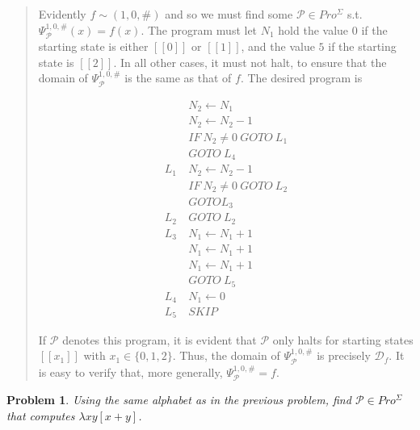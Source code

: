 \documentclass[a4paper, 12pt]{article}
\newtheorem{problem}{Problem}
\newtheorem{problem}{Problem}
\begin{document}
\small
\begin{quote}


Evidently $f \sim (1, 0, \#)$ and so we must find some $\mathcal{P} \in
Pro^{\Sigma}$ s.t. $\Psi_{\mathcal{P}}^{1, 0, \#}(x) = f(x)$. The program must
let $N_1$ hold the value $0$ if the starting state is either $[\![ 0 ]\!]$ or
$[\![ 1 ]\!]$, and the value $5$ if the starting state is $[\![ 2 ]\!]$. In all
other cases, it must not halt, to ensure that the domain of
$\Psi_{\mathcal{P}}^{1, 0, \#}$ is the same as that of $f$. The desired program
is 

\begin{align*}
    &N_2 \leftarrow N_1\\
    &N_2 \leftarrow N_2 - 1\\
    &IF ~ N_2 \neq 0 ~ GOTO ~L_1 \\ 
    &GOTO ~ L_4 \\ 
    L_1 ~ &N_2 \leftarrow N_2 - 1 \\ 
    &IF ~  N_2 \neq 0 ~ GOTO ~ L_2\\
    &GOTO L_3\\
    L_2~& GOTO ~ L_2 \\ 
    L_3 ~ & N_1 \leftarrow N_1 + 1\\
    & N_1 \leftarrow N_1 + 1\\
    & N_1 \leftarrow N_1 + 1 \\ 
    & GOTO ~ L_5 \\
    L_4 ~ & N_1 \leftarrow 0 \\ 
    L_5~& SKIP
\end{align*}

If $\mathcal{P}$ denotes this program, it is evident that $\mathcal{P}$ only
halts for starting states $[\![ x_1 ]\!]$ with $x_1 \in \{0, 1, 2\}$.
Thus, the domain of $\Psi_{\mathcal{P}}^{1, 0, \#}$ is precisely
$\mathcal{D}_f$. It is easy to verify that, more generally,
$\Psi_{\mathcal{P}}^{1, 0, \#} = f$.

\end{quote}
\normalsize

\begin{problem}
    Using the same alphabet as in the previous problem, find $\mathcal{P} \in
    Pro^{\Sigma}$ that computes $\lambda xy[x + y]$.
\end{problem}
\end{document}
